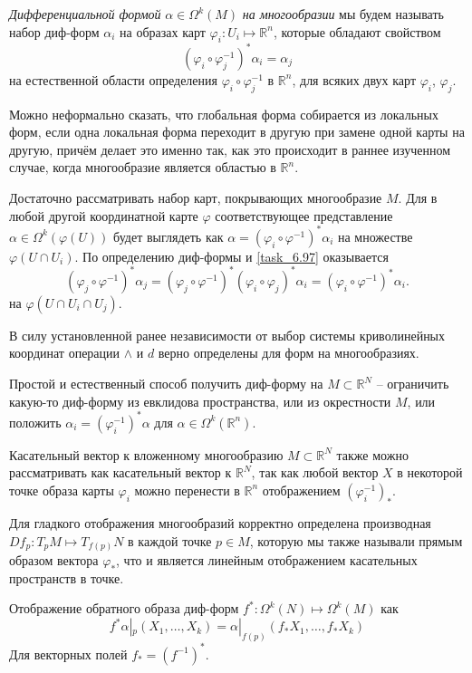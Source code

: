 \begin{to_def} 
    \textit{Дифференциальной формой} $\alpha \in \Omega^k (M)$ \textit{на многообразии} мы будем называть набор диф-форм $\alpha_i$ на образах карт $\varphi_i \colon U_i \mapsto \mathbb{R}^n$, которые обладают свойством
    \begin{equation*}
        (\varphi_i \circ \varphi_j^{-1})^* \alpha_i = \alpha_j
    \end{equation*}
    на естественной области определения $\varphi_i \circ \varphi_j^{-1}$ в $\mathbb{R}^n$, для всяких двух карт $\varphi_i$, $\varphi_j$. 
\end{to_def}

Можно неформально сказать, что глобальная форма собирается из локальных форм, если одна локальная форма переходит в другую при замене одной карты на другую, причём делает это именно так, как это происходит в раннее изученном случае, когда многообразие является областью в $\mathbb{R}^n$.

Достаточно рассматривать набор карт, покрывающих многообразие $M$. Для в любой другой координатной карте $\varphi$ соответствующее представление $\alpha \in \Omega^k (\varphi(U))$ будет выглядеть как $\alpha = (\varphi_i \circ \varphi^{-1})^* \alpha_i$ на множестве $\varphi(U \cap U_i)$. 
По определению диф-формы и \eqref{task_6.97} оказывается 
\begin{equation*}
    (\varphi_j \circ \varphi^{-1})^* \alpha_j = 
    (\varphi_j \circ \varphi^{-1})^* (\varphi_i \circ \varphi_j)^* \alpha_i = (\varphi_i \circ \varphi^{-1})^* \alpha_i.
\end{equation*}
на $\varphi(U \cap U_i \cap U_j)$. 


В силу установленной ранее независимости от выбор системы криволинейных координат операции $\wedge$ и $d$ верно определены для форм на многообразиях.

Простой и естественный способ получить диф-форму на $M \subset \mathbb{R}^N$ -- ограничить какую-то диф-форму из евклидова пространства, или из окрестности $M$, или положить $\alpha_i = (\varphi_i^{-1})^* \alpha$ для $\alpha \in \Omega^k (\mathbb{R}^n)$. 

Касательный вектор к вложенному многообразию $M \subset \mathbb{R}^N$ также можно рассматривать как касательный вектор к $\mathbb{R}^N$, так как любой вектор $X$ в некоторой точке образа карты $\varphi_i$ можно перенести в $\mathbb{R}^n$ отображением $(\varphi_i^{-1})_*$.



Для гладкого отображения многообразий корректно определена производная $Df_p \colon T_p M \mapsto T_{f(p)}N$ в каждой точке $p \in M$, которую мы также называли прямым образом вектора $\varphi_*$, что и является линейным отображением касательных пространств в точке.

Отображение обратного образа диф-форм $f^* \colon \Omega^k(N) \mapsto \Omega^k(M)$ как
\begin{equation*}
    f^* \alpha|_p (X_1, \ldots, X_k) = \alpha|_{f(p)} (f_* X_1, \ldots, f_* X_k)
\end{equation*}
Для векторных полей $f_* = (f^{-1})^*$.
